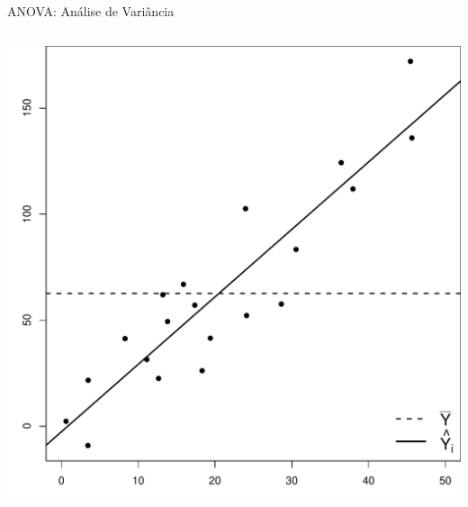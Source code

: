 \documentclass{beamer}\usepackage[]{graphicx}\usepackage[]{color}
\makeatletter
\def\maxwidth{ %
  \ifdim\Gin@nat@width>\linewidth
    \linewidth
  \else
    \Gin@nat@width
  \fi
}
\newenvironment{knitrout}{}{} %
\renewenvironment{knitrout}{\setlength{\topsep}{0mm}}{}
\makeatother
\begin{document}
\begin{frame}{ANOVA: Análise de Variância}

\begin{columns}[c]



\begin{knitrout}
\color{fgcolor}
\includegraphics[width=\maxwidth]{figure/unnamed-chunk-1-1} 

\end{knitrout}

\pause



\end{columns}
\end{frame}
\end{document}
